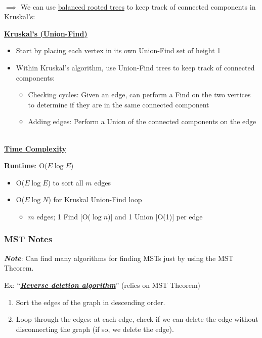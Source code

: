 \documentclass[12pt]{extarticle}
\theoremstyle{definition}
\theoremstyle{remark}
\newcommand{\probtitle}[1]{\noindent \textbf{\ul{#1}}}
\begin{document}
~\\
\noindent$\implies$ We can use \ul{balanced rooted trees} to keep track of connected components in Kruskal's:

\begin{tcolorbox}[colback=red!70!yellow!15!white]
    \probtitle{Kruskal's (Union-Find)}
    \begin{itemize}
        \item Start by placing each vertex in its own Union-Find set of height 1
        \item Within Kruskal's algorithm, use Union-Find trees to keep track of connected components: \begin{itemize}
            \item Checking cycles: Given an edge, can perform a Find on the two vertices to determine if they are in the same connected component
            \item Adding edges: Perform a Union of the connected components on the edge
        \end{itemize}
    \end{itemize}
\end{tcolorbox}

~\\
\noindent\textbf{\ul{Time Complexity}}

\vspace{8pt}
\noindent \textbf{Runtime}: O($E\log E$)
\begin{itemize}
    \item O($E\log E$) to sort all $m$ edges
    \item O($E\log N$) for Kruskal Union-Find loop \begin{itemize}
        \item $m$ edges; 1 Find [O($\log n$)] and 1 Union [O(1)] per edge
    \end{itemize}
\end{itemize}

\subsubsection*{MST Notes}
\textbf{\textit{Note}}: Can find many algorithms for finding MSTs just by using the MST Theorem.

\vspace{8pt}
\noindent Ex: ``\textbf{\textit{\ul{Reverse deletion algorithm}}}'' (relies on MST Theorem)\begin{enumerate}
    \item Sort the edges of the graph in descending order.
    \item Loop through the edges: at each edge, check if we can delete the edge without disconnecting the graph (if so, we delete the edge).
\end{enumerate}
\end{document}
